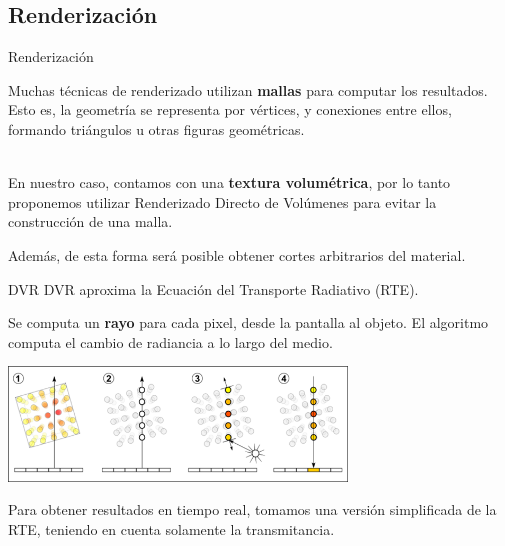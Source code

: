 \documentclass[spanish]{beamer}
\begin{document}
\subsection{Renderización}

\begin{frame}{Renderización}

Muchas técnicas de renderizado utilizan \textbf{mallas} para computar los resultados.
Esto es, la geometría se representa por vértices, y conexiones entre ellos, formando triángulos u otras figuras geométricas.

\ \\

En nuestro caso, contamos con una \textbf{textura volumétrica}, por lo tanto proponemos utilizar Renderizado Directo de Volúmenes para evitar la construcción de una malla.

Además, de esta forma será posible obtener cortes arbitrarios del material.

\end{frame}

\begin{frame}{DVR}
DVR aproxima la Ecuación del Transporte Radiativo (RTE).

Se computa un \textbf{rayo} para cada pixel, desde la pantalla al objeto. El algoritmo computa el cambio de radiancia a lo largo del medio.


\centerline{\includegraphics[width=9cm]{../figures/dvr}}

Para obtener resultados en tiempo real, tomamos una versión simplificada de la RTE, teniendo en cuenta solamente la transmitancia.
\end{frame}
\end{document}
